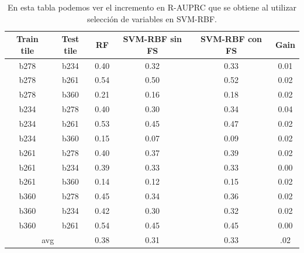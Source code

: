 \begin{table}[]
\centering
\begin{tabular}{|c|c|c|c|c|c|}
\hline
\textbf{Train tile} & \textbf{Test tile} & \textbf{RF} & \textbf{SVM-RBF sin FS} & \textbf{SVM-RBF con FS} & \textbf{Gain} \\ \hline
b278                & b234               & 0.40        & 0.32                    & 0.33                    & 0.01          \\ \hline
b278                & b261               & 0.54        & 0.50                    & 0.52                    & 0.02          \\ \hline
b278                & b360               & 0.21        & 0.16                    & 0.18                    & 0.02          \\ \hline
b234                & b278               & 0.40        & 0.30                    & 0.34                    & 0.04          \\ \hline
b234                & b261               & 0.53        & 0.45                    & 0.47                    & 0.02          \\ \hline
b234                & b360               & 0.15        & 0.07                    & 0.09                    & 0.02          \\ \hline
b261                & b278               & 0.40        & 0.37                    & 0.39                    & 0.02          \\ \hline
b261                & b234               & 0.39        & 0.33                    & 0.33                    & 0.00          \\ \hline
b261                & b360               & 0.14        & 0.12                    & 0.15                    & 0.02          \\ \hline
b360                & b278               & 0.45        & 0.34                    & 0.36                    & 0.02          \\ \hline
b360                & b234               & 0.42        & 0.30                    & 0.32                    & 0.02          \\ \hline
b360                & b261               & 0.54        & 0.45                    & 0.45                    & 0.00          \\ \hline
\multicolumn{2}{|c|}{avg}                & 0.38        & 0.31                    & 0.33                   & {\color[HTML]{009901} .02}          \\ \hline
\end{tabular}
\caption{En esta tabla podemos ver el incremento en R-AUPRC que se obtiene al utilizar selección de variables en SVM-RBF. }
\label{tab:fs_comparison_r} 
\end{table}